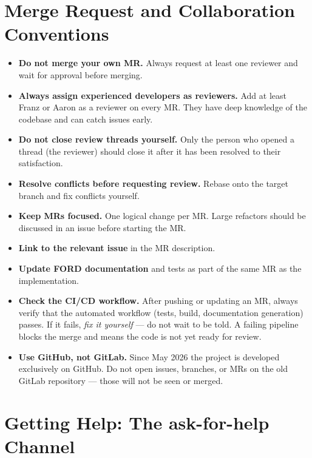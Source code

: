 \documentclass{article}
\begin{document}
\section{Merge Request and Collaboration Conventions}

\begin{itemize}
  \item \textbf{Do not merge your own MR.} Always request at least one reviewer and wait for approval before merging.
  \item \textbf{Always assign experienced developers as reviewers.} Add at least Franz or Aaron as a reviewer on every MR. They have deep knowledge of the codebase and can catch issues early.
  \item \textbf{Do not close review threads yourself.} Only the person who opened a thread (the reviewer) should close it after it has been resolved to their satisfaction.
  \item \textbf{Resolve conflicts before requesting review.} Rebase onto the target branch and fix conflicts yourself.
  \item \textbf{Keep MRs focused.} One logical change per MR. Large refactors should be discussed in an issue before starting the MR.
  \item \textbf{Link to the relevant issue} in the MR description.
  \item \textbf{Update FORD documentation} and tests as part of the same MR as the implementation.
  \item \textbf{Check the CI/CD workflow.} After pushing or updating an MR, always verify that the automated workflow (tests, build, documentation generation) passes. If it fails, \emph{fix it yourself} — do not wait to be told. A failing pipeline blocks the merge and means the code is not yet ready for review.
  \item \textbf{Use GitHub, not GitLab.} Since May 2026 the project is developed exclusively on GitHub. Do not open issues, branches, or MRs on the old GitLab repository — those will not be seen or merged.
\end{itemize}

\section{Getting Help: The ask-for-help Channel}
\end{document}
